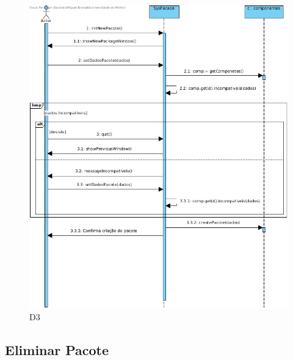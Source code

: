 \begin{figure}[H]
    \centering
    \includegraphics[width=\textwidth]{diagramas_de_sequencia/imgs/UserSystemUC4D3.jpg}
    \caption{D3}
\end{figure}

\subsection{Eliminar Pacote}

